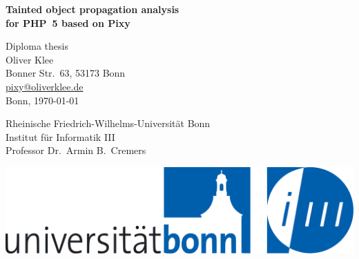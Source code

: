 \begin{titlepage}


\begin{center}
\huge\textbf{\textsf{\textcolor{cs3}{Tainted object propagation analysis\\for PHP~5 based on Pixy}}\normalsize}
\end{center}

\vfill

\begin{center}
  \textsf{
    Diploma thesis\\
    \vspace{1em}
    Oliver Klee\\
    Bonner Str.~63, 53173 Bonn\\
    \url{pixy@oliverklee.de}\\
    \vspace{1em}
    Bonn, \today
  }
\end{center}

\vfill

\begin{minipage}{8cm}
  \textsf{Rheinische Friedrich-Wilhelms-Universität Bonn\\Institut für Informatik III\\Professor Dr.~Armin B.~Cremers}
\end{minipage}
\begin{minipage}{8cm}
\includegraphics[scale=.12]{logo_ubo_i3_rgb}{}
\end{minipage}

\end{titlepage}
